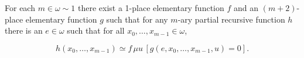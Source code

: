 For each $m \in \omega \sim 1$ there exist a 1-place elementary function $f$ and an $(m + 2)$-place elementary function $g$ such that for any $m$-ary partial recursive function $h$ there is an $e \in \omega$ such that for all $x_0, \ldots, x_{m-1} \in \omega$,

$$h(x_0, \ldots, x_{m-1}) \simeq f \, \mu u \, [g(e, x_0, \ldots, x_{m-1}, u) = 0].$$
